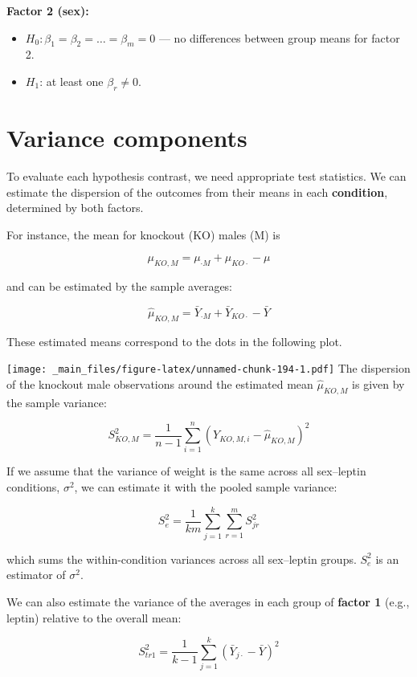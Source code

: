 \documentclass[
]{book}
\providecommand{\tightlist}{%
  \setlength{\itemsep}{0pt}\setlength{\parskip}{0pt}}
\begin{document}
\textbf{Factor 2 (sex):}

\begin{itemize}
\tightlist
\item
  \(H_0: \beta_1 = \beta_2 = \dots = \beta_m = 0\) --- no differences between group means for factor 2.
\item
  \(H_1\): at least one \(\beta_r \neq 0\).
\end{itemize}

\hypertarget{variance-components}{%
\section{Variance components}\label{variance-components}}

To evaluate each hypothesis contrast, we need appropriate test statistics. We can estimate the dispersion of the outcomes from their means in each \textbf{condition}, determined by both factors.

For instance, the mean for knockout (KO) males (M) is

\[
\mu_{KO,M} = \mu_{\cdot M} + \mu_{KO\cdot} - \mu
\]

and can be estimated by the sample averages:

\[
\hat{\mu}_{KO,M} = \bar{Y}_{\cdot M} + \bar{Y}_{KO\cdot} - \bar{Y}
\]

These estimated means correspond to the dots in the following plot.

\texttt{[image: \_main\_files/figure-latex/unnamed-chunk-194-1.pdf]}
The dispersion of the knockout male observations around the estimated mean \(\hat{\mu}_{KO,M}\) is given by the sample variance:

\[
S^2_{KO,M} = \frac{1}{n-1} \sum_{i=1}^n \left(Y_{KO,M,i} - \hat{\mu}_{KO,M}\right)^2
\]

If we assume that the variance of weight is the same across all sex--leptin conditions, \(\sigma^2\), we can estimate it with the pooled sample variance:

\[
S_e^2 = \frac{1}{km} \sum_{j=1}^k \sum_{r=1}^m S^2_{jr}
\]

which sums the within-condition variances across all sex--leptin groups. \(S_e^2\) is an estimator of \(\sigma^2\).

We can also estimate the variance of the averages in each group of \textbf{factor 1} (e.g., leptin) relative to the overall mean:

\[
S^2_{tr1} = \frac{1}{k-1} \sum_{j=1}^k \left(\bar{Y}_{j\cdot} - \bar{Y}\right)^2
\]
\end{document}
